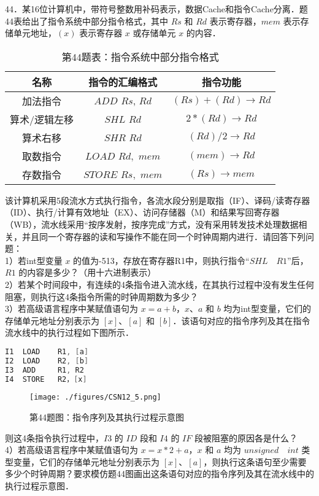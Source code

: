 44．某16位计算机中，带符号整数用补码表示，数据Cache和指令Cache分离．题44表给出了指令系统中部分指令格式，其中 $Rs$ 和 $Rd$ 表示寄存器，$mem$ 表示存储单元地址，$(x)$ 表示寄存器 $x$ 或存储单元 $x$ 的内容．\\
\begin{table}[ht]
\centering
\caption{第44题表：指令系统中部分指令格式}\label{CSN12_tab2}
\begin{tabular}{|c|c|c|}
\hline
名称 & 指令的汇编格式 & 指令功能 \\
\hline
加法指令 & $ADD$ $Rs$, $Rd$ & $(Rs)+(Rd) \rightarrow Rd$ \\
\hline
算术/逻辑左移 & $SHL$ $Rd$ & $2*(Rd) \rightarrow Rd$ \\
\hline
算术右移 & $SHR$ $Rd$ & $(Rd)/2 \rightarrow Rd$ \\
\hline
取数指令& $LOAD$ $Rd,$ $mem$ & $(mem) \rightarrow Rd$ \\
\hline
存数指令 & $STORE$ $Rs,$ $mem$ & $(Rs) \rightarrow mem$ \\
\hline
\end{tabular}
\end{table}
该计算机采用5段流水方式执行指令，各流水段分别是取指（IF）、译码/读寄存器（ID）、执行/计算有效地址（EX）、访问存储器（M）和结果写回寄存器（WB），流水线采用“按序发射，按序完成”方式，没有采用转发技术处理数据相关，并且同一个寄存器的读和写操作不能在同一个时钟周期内进行．请回答下列问题：\\
1）若int型变量 $x$ 的值为-513，存放在寄存器R1中，则执行指令“$SHL \quad R1$”后，$R1$ 的内容是多少？（用十六进制表示）\\
2）若某个时间段中，有连续的4条指令进入流水线，在其执行过程中没有发生任何阻塞，则执行这4条指令所需的时钟周期数为多少？\\
3）若高级语言程序中某赋值语句为 $x=a+b$，$x$、$a$ 和 $b$ 均为int型变量，它们的存储单元地址分别表示为 $[x]$、$[a]$ 和 $[b]$．该语句对应的指令序列及其在指令流水线中的执行过程如下图所示．\\
\begin{lstlisting}[language=cpp]
I1  LOAD    R1, [a]
I2  LOAD    R2, [b]
I3  ADD     R1, R2
I4  STORE   R2，[x]
\end{lstlisting}
\begin{figure}[ht]
\centering
\texttt{[image: ./figures/CSN12\_5.png]}
\caption{第44题图：指令序列及其执行过程示意图} \label{CSN12_fig5}
\end{figure}
则这4条指令执行过程中，$I3$ 的 $ID$ 段和 $I4$ 的 $IF$ 段被阻塞的原因各是什么？\\
4）若高级语言程序中某赋值语句为 $x=x*2+a$，$x$ 和 $a$ 均为 $unsigned \quad int$ 类型变量，它们的存储单元地址分别表示为 $[x]$、$[a]$，则执行这条语句至少需要多少个时钟周期？要求模仿题44图画出这条语句对应的指令序列及其在流水线中的执行过程示意图．

